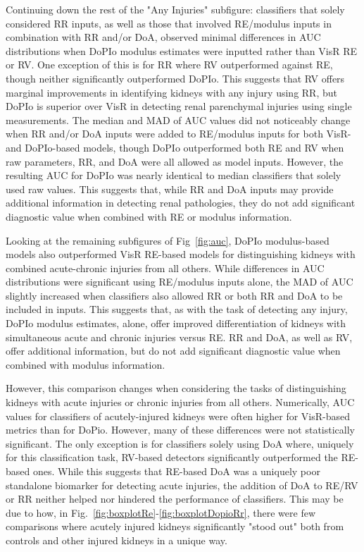 Continuing down the rest of the "Any Injuries" subfigure: classifiers that solely considered RR inputs, as well as those that involved RE/modulus inputs in combination with RR and/or DoA, observed minimal differences in AUC distributions when DoPIo modulus estimates were inputted rather than VisR RE or RV. One exception of this is for RR where RV outperformed against RE, though neither significantly outperformed DoPIo. This suggests that RV offers marginal improvements in identifying kidneys with any injury using RR, but DoPIo is superior over VisR in detecting renal parenchymal injuries using single measurements. The median and MAD of AUC values did not noticeably change when RR and/or DoA inputs were added to RE/modulus inputs for both VisR- and DoPIo-based models, though DoPIo outperformed both RE and RV when raw parameters, RR, and DoA were all allowed as model inputs. However, the resulting AUC for DoPIo was nearly identical to median classifiers that solely used raw values. This suggests that, while RR and DoA inputs may provide additional information in detecting renal pathologies, they do not add significant diagnostic value when combined with RE or modulus information.

Looking at the remaining subfigures of Fig~\ref{fig:auc}, DoPIo modulus-based models also outperformed VisR RE-based models for distinguishing kidneys with combined acute-chronic injuries from all others. While differences in AUC distributions were significant using RE/modulus inputs alone, the MAD of AUC slightly increased when classifiers also allowed RR or both RR and DoA to be included in inputs. This suggests that, as with the task of detecting any injury, DoPIo modulus estimates, alone, offer improved differentiation of kidneys with simultaneous acute and chronic injuries versus RE. RR and DoA, as well as RV, offer additional information, but do not add significant diagnostic value when combined with modulus information.

However, this comparison changes when considering the tasks of distinguishing kidneys with acute injuries or chronic injuries from all others. Numerically, AUC values for classifiers of acutely-injured kidneys were often higher for VisR-based metrics than for DoPio. However, many of these differences were not statistically significant. The only exception is for classifiers solely using DoA where, uniquely for this classification task, RV-based detectors significantly outperformed the RE-based ones. While this suggests that RE-based DoA was a uniquely poor standalone biomarker for detecting acute injuries, the addition of DoA to RE/RV or RR neither helped nor hindered the performance of classifiers. This may be due to how, in Fig.~\ref{fig:boxplotRe}-\ref{fig:boxplotDopioRr}, there were few comparisons where acutely injured kidneys significantly "stood out" both from controls and other injured kidneys in a unique way.

